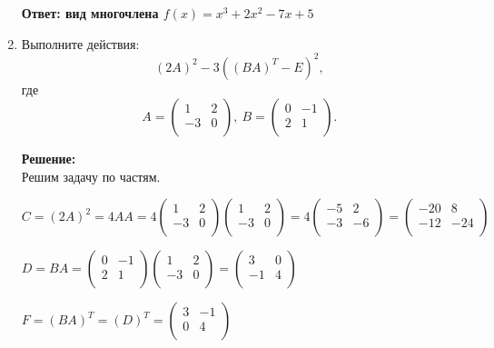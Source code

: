 \documentclass[a4paper,12pt]{article}
\begin{document}
\begin{enumerate}
\textbf{Ответ: вид многочлена $f(x)=x^3+2x^2-7x+5$}

\item
Выполните действия:
\[
(2A)^2 - 3((BA)^T - E)^2,
\]
где 
\[
A = \begin{pmatrix}
1 & 2\\
-3 & 0\\
\end{pmatrix},\
B = \begin{pmatrix}
0 & -1\\
2 & 1\\
\end{pmatrix}.
\]

\textbf{Решение:}\\
Решим задачу по частям.

$C=(2A)^2 =4AA=4\begin{pmatrix}
1 & 2\\
-3 & 0\\
\end{pmatrix}\begin{pmatrix}
1 & 2\\
-3 & 0\\
\end{pmatrix}=4\begin{pmatrix}
-5 & 2\\
-3 & -6\\
\end{pmatrix}=\begin{pmatrix}
-20 & 8\\
-12 & -24\\
\end{pmatrix}$

$D=BA=\begin{pmatrix}
0 & -1\\
2 & 1\\
\end{pmatrix}\begin{pmatrix}
1 & 2\\
-3 & 0\\
\end{pmatrix}=\begin{pmatrix}
3 & 0\\
-1 & 4\\
\end{pmatrix}$

$F=(BA)^T=(D)^T=\begin{pmatrix}
3 & -1\\
0 & 4\\
\end{pmatrix}$


\end{enumerate}
\end{document}
